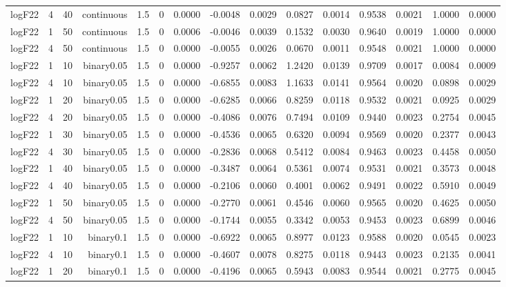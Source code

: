 \begin{longtable}{rrrrrrrrrrrrrrr}
  logF22 & 4 & 40 & continuous & 1.5 & 0 & 0.0000 & -0.0048 & 0.0029 & 0.0827 & 0.0014 & 0.9538 & 0.0021 & 1.0000 & 0.0000 \\ 
  logF22 & 1 & 50 & continuous & 1.5 & 0 & 0.0006 & -0.0046 & 0.0039 & 0.1532 & 0.0030 & 0.9640 & 0.0019 & 1.0000 & 0.0000 \\ 
  logF22 & 4 & 50 & continuous & 1.5 & 0 & 0.0000 & -0.0055 & 0.0026 & 0.0670 & 0.0011 & 0.9548 & 0.0021 & 1.0000 & 0.0000 \\ 
  logF22 & 1 & 10 & binary0.05 & 1.5 & 0 & 0.0000 & -0.9257 & 0.0062 & 1.2420 & 0.0139 & 0.9709 & 0.0017 & 0.0084 & 0.0009 \\ 
  logF22 & 4 & 10 & binary0.05 & 1.5 & 0 & 0.0000 & -0.6855 & 0.0083 & 1.1633 & 0.0141 & 0.9564 & 0.0020 & 0.0898 & 0.0029 \\ 
  logF22 & 1 & 20 & binary0.05 & 1.5 & 0 & 0.0000 & -0.6285 & 0.0066 & 0.8259 & 0.0118 & 0.9532 & 0.0021 & 0.0925 & 0.0029 \\ 
  logF22 & 4 & 20 & binary0.05 & 1.5 & 0 & 0.0000 & -0.4086 & 0.0076 & 0.7494 & 0.0109 & 0.9440 & 0.0023 & 0.2754 & 0.0045 \\ 
  logF22 & 1 & 30 & binary0.05 & 1.5 & 0 & 0.0000 & -0.4536 & 0.0065 & 0.6320 & 0.0094 & 0.9569 & 0.0020 & 0.2377 & 0.0043 \\ 
  logF22 & 4 & 30 & binary0.05 & 1.5 & 0 & 0.0000 & -0.2836 & 0.0068 & 0.5412 & 0.0084 & 0.9463 & 0.0023 & 0.4458 & 0.0050 \\ 
  logF22 & 1 & 40 & binary0.05 & 1.5 & 0 & 0.0000 & -0.3487 & 0.0064 & 0.5361 & 0.0074 & 0.9531 & 0.0021 & 0.3573 & 0.0048 \\ 
  logF22 & 4 & 40 & binary0.05 & 1.5 & 0 & 0.0000 & -0.2106 & 0.0060 & 0.4001 & 0.0062 & 0.9491 & 0.0022 & 0.5910 & 0.0049 \\ 
  logF22 & 1 & 50 & binary0.05 & 1.5 & 0 & 0.0000 & -0.2770 & 0.0061 & 0.4546 & 0.0060 & 0.9565 & 0.0020 & 0.4625 & 0.0050 \\ 
  logF22 & 4 & 50 & binary0.05 & 1.5 & 0 & 0.0000 & -0.1744 & 0.0055 & 0.3342 & 0.0053 & 0.9453 & 0.0023 & 0.6899 & 0.0046 \\ 
  logF22 & 1 & 10 & binary0.1 & 1.5 & 0 & 0.0000 & -0.6922 & 0.0065 & 0.8977 & 0.0123 & 0.9588 & 0.0020 & 0.0545 & 0.0023 \\ 
  logF22 & 4 & 10 & binary0.1 & 1.5 & 0 & 0.0000 & -0.4607 & 0.0078 & 0.8275 & 0.0118 & 0.9443 & 0.0023 & 0.2135 & 0.0041 \\ 
  logF22 & 1 & 20 & binary0.1 & 1.5 & 0 & 0.0000 & -0.4196 & 0.0065 & 0.5943 & 0.0083 & 0.9544 & 0.0021 & 0.2775 & 0.0045 \\ 

\end{longtable}
